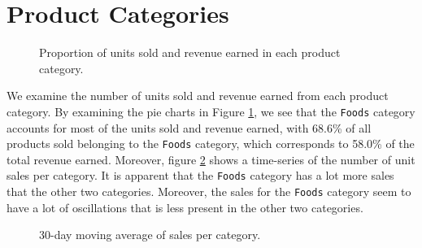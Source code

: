 \section{Product Categories}
\begin{figure}
    \vspace{-15pt}
    \centering
    \captionsetup{width=0.52\textwidth}
    \caption{Proportion of units sold and revenue earned in each product category.}
    \label{fig:sales_rev_cats}
    \vspace{-20pt}
\end{figure}
   
We examine the number of units sold and revenue earned from each product category.
By examining the pie charts in Figure \ref{fig:sales_rev_cats}, we see that the \texttt{Foods} category accounts for most of the units sold and revenue earned, with 68.6\% of all products sold belonging to the \texttt{Foods} category, which corresponds to 58.0\% of the total revenue earned.
Moreover, figure \ref{fig:cat_sales} shows a time-series of the number of unit sales per category.
It is apparent that the \texttt{Foods} category has a lot more sales that the other two categories.
Moreover, the sales for the \texttt{Foods} category seem to have a lot of oscillations that is less present in the other two categories.

\begin{figure}[b!]
    \centering
    \captionsetup{width=0.98\textwidth}
    \caption{30-day moving average of sales per category.}
    \label{fig:cat_sales}
\end{figure} 


